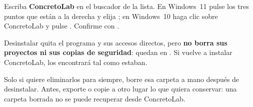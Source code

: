 
Escriba \textbf{ConcretoLab} en el buscador de la lista. En Windows~11 pulse los tres puntos \boton{\ldots} que están a la
derecha y elija ; en Windows~10 haga clic sobre ConcretoLab y pulse . Confirme con
.

\begin{importante}
Desinstalar quita el programa y sus accesos directos, pero \textbf{no borra sus proyectos ni sus copias de seguridad}:
quedan en . Si vuelve a instalar
ConcretoLab, los encontrará tal como estaban.

Solo si quiere eliminarlos para siempre, borre esa carpeta a mano después de desinstalar. Antes, exporte o copie a
otro lugar lo que quiera conservar: una carpeta borrada no se puede recuperar desde ConcretoLab.
\end{importante}

